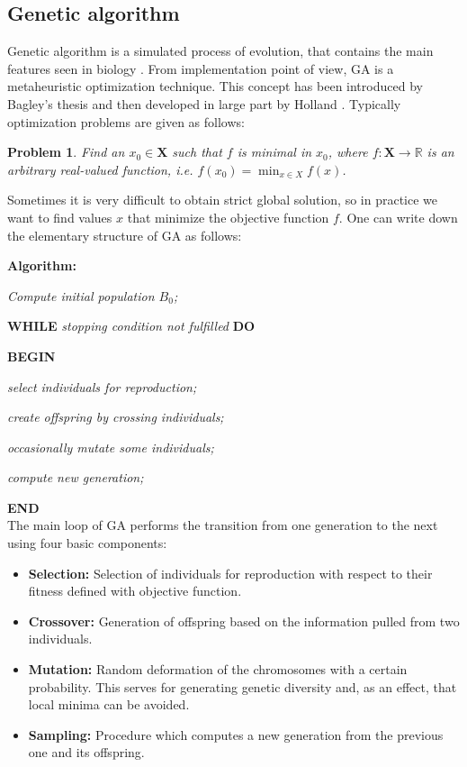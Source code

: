 \documentclass[applsci,article,preprint,moreauthors,pdftex]{Definitions/mdpi}
\newtheorem*{problem}{Problem}
\begin{document}
\subsection{Genetic algorithm}

Genetic algorithm is a simulated process of evolution, that contains the main features seen in biology \cite{darwin2008origin}. From implementation point of view, GA is a metaheuristic optimization technique. This concept has been introduced by Bagley’s thesis \cite{bagley1967behavior} and then developed in large part by Holland \cite{holland1989induction,holland1992adaptation}. Typically optimization problems are given as follows:

\begin{problem}
    Find an $x_0\in \mathbf{X}$ such that $f$ is minimal in $x_0$, where $f:\mathbf{X}\rightarrow \mathbb{R}$ is an arbitrary real-valued function, i.e. $f(x_0)=\min_{x\in X}f(x)$.
\end{problem}

Sometimes it is very difficult to obtain strict global solution, so in practice we want to find values $x$ that minimize the objective function $f$. One can write down the elementary structure of GA as follows:

\textbf{Algorithm:}

\textit{Compute initial population $B_0$;}

\textbf{WHILE} \textit{stopping condition not fulfilled} \textbf{DO}

\textbf{BEGIN}

\textit{select individuals for reproduction;}

\textit{create offspring by crossing individuals;}

\textit{occasionally mutate some individuals;}

\textit{compute new generation;}

\textbf{END}
\\
The main loop of GA performs the transition from one generation to the next using four basic components:
\begin{itemize}
    \item \textbf{Selection:} Selection of individuals for reproduction with respect to their fitness defined with objective function.
    \item \textbf{Crossover:} Generation of offspring based on the information pulled from two individuals.
    \item \textbf{Mutation:} Random deformation of the chromosomes with a certain probability. This serves for generating genetic diversity and, as an effect, that local minima can be avoided.
    \item \textbf{Sampling:} Procedure which computes a new generation from the previous one and its offspring.
\end{itemize}
\end{document}
